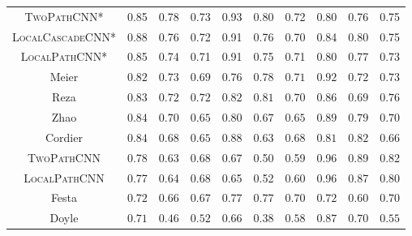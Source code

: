 \documentclass[final,5p,times,twocolumn]{elsarticle}
\begin{document}
{\begin{table}[tp]
\begin{center}
{\begin{tabular}{*{10}{c}}
     


\rowcolor[gray]{0.9}\textsc{TwoPathCNN*} &0.85 & 0.78 & 0.73 &0.93  &0.80  &0.72  &0.80  &0.76  &0.75   \\ %

 \rowcolor[gray]{0.9}\textsc{LocalCascadeCNN*} &  0.88  &0.76  &0.72  &0.91  &0.76  &0.70  &0.84  &0.80  &0.75      \\ %

\rowcolor[gray]{0.9}\textsc{LocalPathCNN*}&  0.85  &0.74  &0.71  &0.91  &0.75  &0.71  &0.80  &0.77  &0.73   \\ %
Meier    	&$0.82$	&$0.73$	&$0.69$	&$0.76$	&$0.78$	&$0.71$	&$0.92$	&$0.72$	&$0.73$\\ %
Reza  	&$0.83$	&$0.72$	&$0.72$	&$0.82$	&$0.81$	&$0.70$	&$0.86$	&$0.69$	&$0.76$	\\ %
Zhao    	&$0.84$	&$0.70$	&$0.65$	&$0.80$	&$0.67$	&$0.65$	&$0.89$	&$0.79$	&$0.70$\\ %
Cordier 	&$0.84$	&$0.68$	&$0.65$	&$0.88$	&$0.63$	&$0.68$	&$0.81$	&$0.82$	&$0.66$\\ %
\rowcolor[gray]{0.9}\textsc{TwoPathCNN}&  0.78  &0.63  &0.68  &0.67  &0.50  &0.59  &0.96  &0.89  &0.82  \\ %
\rowcolor[gray]{0.9}\textsc{LocalPathCNN}&  0.77  &0.64  &0.68  &0.65  &0.52  &0.60  &0.96  &0.87  &0.80  \\ %
Festa 	&$0.72$	&$0.66$	&$0.67$	&$0.77$	&$0.77$	&$0.70$	&$0.72$	&$0.60$	&$0.70$	\\ %
Doyle 	&$0.71$	&$0.46$	&$0.52$	&$0.66$	&$0.38$	&$0.58$	&$0.87$	&$0.70$	&$0.55$	\\ \hline

\end{tabular}
}
\end{center}
\label{tab:brats-test}
\end{table}

}
\end{document}
